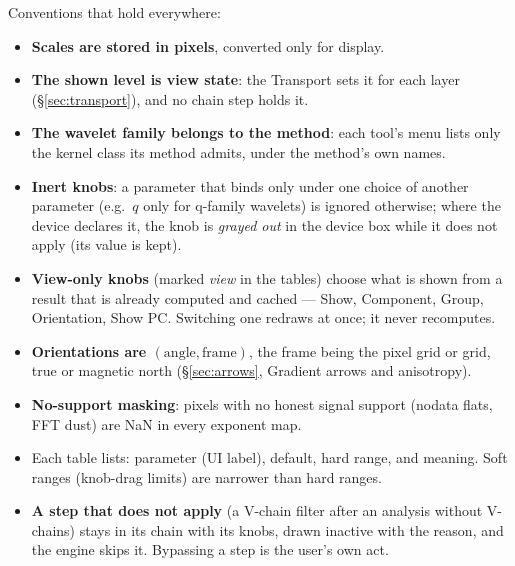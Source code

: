 \documentclass[10pt]{article}
\begin{document}
Conventions that hold everywhere:
\begin{itemize}\itemsep2pt
  \item \textbf{Scales are stored in pixels}, converted only for display.
  \item \textbf{The shown level is view state}: the Transport sets it for each layer
        (\S\ref{sec:transport}), and no chain step holds it.
  \item \textbf{The wavelet family belongs to the method}: each tool's menu lists only the
        kernel class its method admits, under the method's own names.
  \item \textbf{Inert knobs}: a parameter that binds only under one choice of another
        parameter (e.g.\ $q$ only for q-family wavelets) is ignored otherwise; where the device
        declares it, the knob is \emph{grayed out} in the device box while it does not apply
        (its value is kept).
  \item \textbf{View-only knobs} (marked \emph{view} in the tables) choose what is shown from
        a result that is already computed and cached --- Show, Component, Group, Orientation,
        Show PC. Switching one redraws at once; it never recomputes.
  \item \textbf{Orientations are $(\text{angle},\text{frame})$}, the frame being the pixel
        grid or grid, true or magnetic north (\S\ref{sec:arrows}, Gradient arrows and anisotropy).
  \item \textbf{No-support masking}: pixels with no honest signal support (nodata flats,
        FFT dust) are NaN in every exponent map.
  \item Each table lists: parameter (UI label), default, hard range, and meaning. Soft
        ranges (knob-drag limits) are narrower than hard ranges.
  \item \textbf{A step that does not apply} (a V-chain filter after an analysis without
        V-chains) stays in its chain with its knobs, drawn inactive with the reason, and the
        engine skips it. Bypassing a step is the user's own act.
\end{itemize}
\end{document}
